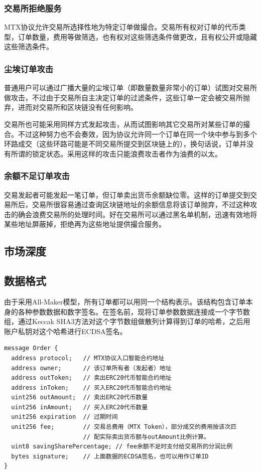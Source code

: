 \documentclass[UTF8,nofonts]{ctexart}
\begin{document}
\subsubsection{交易所拒绝服务}

MTX协议允许交易所选择性地为特定订单做撮合。交易所有权对订单的代币类型，订单数量，费用等做筛选，也有权对这些筛选条件做更改，且有权公开或隐藏这些筛选条件。

\subsubsection{尘埃订单攻击}
普通用户可以通过广播大量的尘埃订单（即数量数量非常小的订单）试图对交易所做攻击，不过由于交易所自主决定订单的过滤条件，这些订单一定会被交易所抛弃，进而对交易所和区块链没有任何影响。

交易所也可能采用同样方式发起攻击，从而试图影响其它交易所对某些订单的撮合。不过这种努力也不会奏效，因为协议允许同一个订单在同一个块中参与到多个环路成交（这些环路可能是不同交易所提交到区块链上的），换句话说，订单并没有所谓的锁定状态。采用这样的攻击只能浪费攻击者作为油费的以太。

\subsubsection{余额不足订单攻击}

交易发起者可能发起一笔订单，但订单卖出货币余额缺位零。这样的订单提交到交易所后，交易所很容易通过查询区块链地址的余额信息将该订单抛弃，不过这种攻击的确会浪费交易所的处理时间。好在交易所可以通过黑名单机制，迅速有效地将某些地址屏蔽掉，拒绝再为这些地址提供撮合服务。


\subsection{市场深度\label{sec:marketdepth}}

\subsection{数据格式\label{sec:dataformat}}

由于采用All-Maker模型，所有订单都可以用同一个结构表示。该结构包含订单本身的各种参数数据和数字签名。在签名前，现将订单参数数据连接成一个字节数组，通过Keccak SHA3方法对这个字节数组做散列计算得到订单的哈希，之后用账户私钥对这个哈希进行ECDSA签名。


\begin{verbatim}
message Order {
  address protocol;   // MTX协议入口智能合约地址
  address owner;      // 该订单所有者（发起者）地址
  address outToken;   // 卖出ERC20代币智能合约地址
  address inToken;    // 买入ERC20代币智能合约地址
  uint256 outAmount;  // 卖出ERC20代币数量
  uint256 inAmount;   // 买入ERC20代币数量
  unit256 expiration  // 过期时间
  unit256 fee;        // 交易总费用（MTX Token），部分成交的费用按该次匹
                      // 配实际卖出货币额与outAmount比例计算。
  uint8 savingSharePercentage; // fee余额不足时支付给交易所的分润比例
  bytes signature;    // 上面数据的ECDSA签名，也可以用作订单ID
}	
\end{verbatim}
\end{document}

